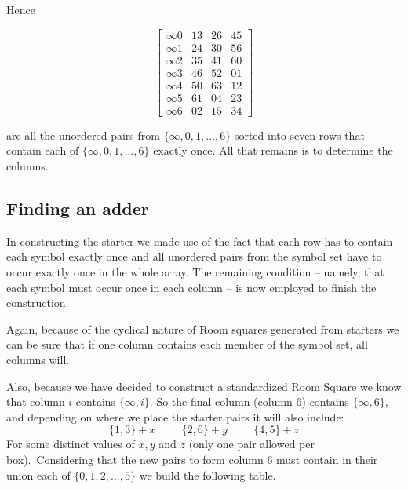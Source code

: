\documentclass[
  11pt,
  a4paper]{book}
\begin{document}
Hence

\begin{equation}
  \begin{bmatrix}
    \infty 0 &  13 &  26 &  45 \\
    \infty 1 &  24 &  30 &  56 \\
    \infty 2 &  35 &  41 &  60 \\
    \infty 3 &  46 &  52 &  01 \\
    \infty 4 &  50 &  63 &  12 \\
    \infty 5 &  61 &  04 &  23 \\
    \infty 6 &  02 &  15 &  34
  \end{bmatrix}
  \label{eq:starter}
\end{equation}

are all the unordered pairs from \(\{\infty, 0, 1, \ldots, 6\}\) sorted
into seven rows that contain each of \(\{\infty, 0, 1, \ldots, 6\}\)
exactly once. All that remains is to determine the columns.

\hypertarget{finding-an-adder}{%
\subsection{Finding an adder}\label{finding-an-adder}}

In constructing the starter we made use of the fact that each row has to
contain each symbol exactly once and all unordered pairs from the symbol
set have to occur exactly once in the whole array. The remaining
condition -- namely, that each symbol must occur once in each column --
is now employed to finish the construction.

Again, because of the cyclical nature of Room squares generated from
starters we can be sure that if one column contains each member of the
symbol set, all columns will.

Also, because we have decided to construct a standardized Room Square we
know that column \(i\) contains \(\{\infty,i\}\). So the final column
(column 6) contains \(\{\infty,6\}\), and depending on where we place
the starter pairs it will also include:
\[\{1,3\}+x \hspace{1cm} \{2,6\}+y \hspace{1cm}
\{4,5\}+z\] For some distinct values of \(x,y\) and \(z\) (only one pair
allowed per box).~Considering that the new pairs to form column 6 must
contain in their union each of \(\{0,1,2,...,5\}\) we build the
following table.
\end{document}
